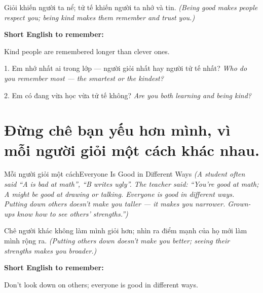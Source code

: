 \begin{baihoc}
Giỏi khiến người ta nể; tử tế khiến người ta nhớ và tin.
\textit{(Being good makes people respect you; being kind makes them remember and trust you.)}
\end{baihoc}

\begin{ghinhoanh}
\textbf{Short English to remember:}

Kind people are remembered longer than clever ones.

\end{ghinhoanh}

\begin{tuhocnhanh}
1. Em nhớ nhất ai trong lớp — người giỏi nhất hay người tử tế nhất? \textit{Who do you remember most — the smartest or the kindest?}

2. Em có đang vừa học vừa tử tế không? \textit{Are you both learning and being kind?}
\end{tuhocnhanh}
\ngancach

\section{Đừng chê bạn yếu hơn mình, vì mỗi người giỏi một cách khác nhau.}
\begin{truyen}{Mỗi người giỏi một cách}{Everyone Is Good in Different Ways}
\textit{(A student often said ``A is bad at math'', ``B writes ugly''. The teacher said: ``You're good at math; A might be good at drawing or talking. Everyone is good in different ways. Putting down others doesn't make you taller — it makes you narrower. Grown-ups know how to see others' strengths.'')}
\end{truyen}

\begin{baihoc}
Chê người khác không làm mình giỏi hơn; nhìn ra điểm mạnh của họ mới làm mình rộng ra.
\textit{(Putting others down doesn't make you better; seeing their strengths makes you broader.)}
\end{baihoc}

\begin{ghinhoanh}
\textbf{Short English to remember:}

Don't look down on others; everyone is good in different ways.

\end{ghinhoanh}

